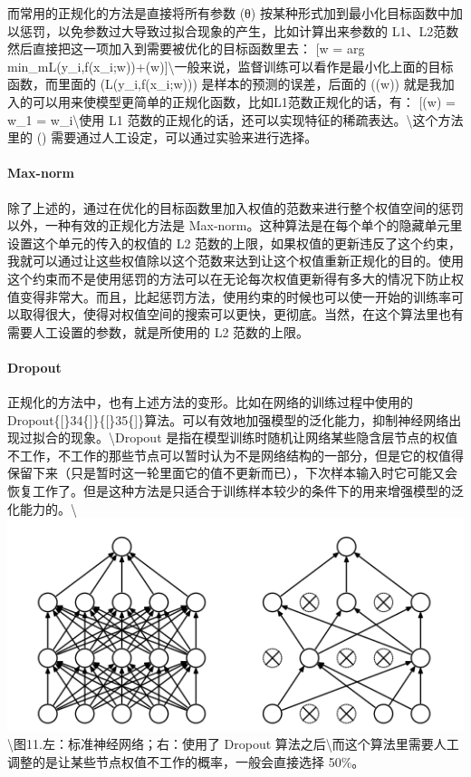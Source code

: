 而常用的正规化的方法是直接将所有参数 (θ)
按某种形式加到最小化目标函数中加以惩罚，以免参数过大导致过拟合现象的产生，比如计算出来参数的
L1、L2范数然后直接把这一项加入到需要被优化的目标函数里去： {[}w = arg
min\_m\sum L(y\_i,f(x\_i;w))+\lambda \Omega(w){]}\textbackslash{}一般来说，监督训练可以看作是最小化上面的目标函数，而里面的
(L(y\_i,f(x\_i;w))) 是样本的预测的误差，后面的 (\Omega(w))
就是我加入的可以用来使模型更简单的正规化函数，比如L1范数正规化的话，有：
{[}\Omega(w) = \textbar{}\textbar{}w\textbar{}\textbar{}\_1 =
\sum\textbar{}w\_i\textbar{}{]}\textbackslash{}使用 L1
范数的正规化的话，还可以实现特征的稀疏表达。\textbackslash{}这个方法里的
(\lambda) 需要通过人工设定，可以通过实验来进行选择。

\paragraph{Max-norm}\label{max-norm}

除了上述的，通过在优化的目标函数里加入权值的范数来进行整个权值空间的惩罚以外，一种有效的正规化方法是
Max-norm。这种算法是在每个单个的隐藏单元里设置这个单元的传入的权值的 L2
范数的上限，如果权值的更新违反了这个约束，我就可以通过让这些权值除以这个范数来达到让这个权值重新正规化的目的。使用这个约束而不是使用惩罚的方法可以在无论每次权值更新得有多大的情况下防止权值变得非常大。而且，比起惩罚方法，使用约束的时候也可以使一开始的训练率可以取得很大，使得对权值空间的搜索可以更快，更彻底。当然，在这个算法里也有需要人工设置的参数，就是所使用的
L2 范数的上限。

\paragraph{Dropout}\label{dropout}

正规化的方法中，也有上述方法的变形。比如在网络的训练过程中使用的
Dropout\{{[}\}34\{{]}\}\{{[}\}35\{{]}\}算法。可以有效地加强模型的泛化能力，抑制神经网络出现过拟合的现象。\textbackslash{}Dropout
是指在模型训练时随机让网络某些隐含层节点的权值不工作，不工作的那些节点可以暂时认为不是网络结构的一部分，但是它的权值得保留下来（只是暂时这一轮里面它的值不更新而已），下次样本输入时它可能又会恢复工作了。但是这种方法是只适合于训练样本较少的条件下的用来增强模型的泛化能力的。\textbackslash{}\includegraphics{picture/dropout.png}\textbackslash{}图11.左：标准神经网络；右：使用了
Dropout
算法之后\textbackslash{}而这个算法里需要人工调整的是让某些节点权值不工作的概率，一般会直接选择
50\%。

